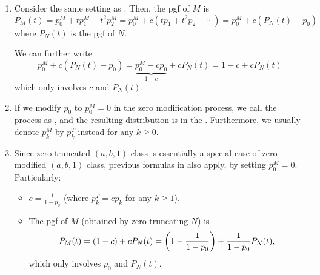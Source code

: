 \begin{enumerate}
\item \label{it:zm-pgf-fmlas}
Consider the same setting as . Then, the pgf
of \(M\) is
 \[
P_M(t)=p_0^M+tp_1^M+t^2p_2^M
=p_0^M+c(tp_1+t^2p_2+\dotsb)
=\boxed{p_0^M+c(P_N(t)-p_0)}
\]
where \(P_N(t)\) is the pgf of \(N\).

We can further write
\[
p_0^M+c(P_N(t)-p_0)
=\underbrace{p_0^M-cp_0}_{1-c}+cP_N(t)
=\boxed{1-c+cP_N(t)}
\]
which only involves \(c\) and \(P_N(t)\).

\item If we modify \(p_0\) to \(p_0^M=0\) in the zero modification process, we
call the process as , and the resulting distribution is
in the . Furthermore, we usually denote
\(p_k^M\) by \(p_k^T\) instead for any \(k\ge 0\).

\item \label{it:zt-fmlas}
Since zero-truncated \((a,b,1)\) class is essentially a special case of
zero-modified \((a,b,1)\) class, previous formulas in
 also apply, by
setting \(p_0^M=0\). Particularly:
\begin{itemize}
\item \(\displaystyle c=\frac{1}{1-p_0}\) (where \(p_k^T=cp_k\) for any \(k\ge 1\)).
\item The pgf of \(M\) (obtained by zero-truncating \(N\)) is
\[
P_M(t)=(1-c)+cP_N(t)=\qty(1-\frac{1}{1-p_0})+\frac{1}{1-p_0}P_N(t),
\]
which only involves \(p_0\) and \(P_N(t)\).
\end{itemize}
\end{enumerate}
